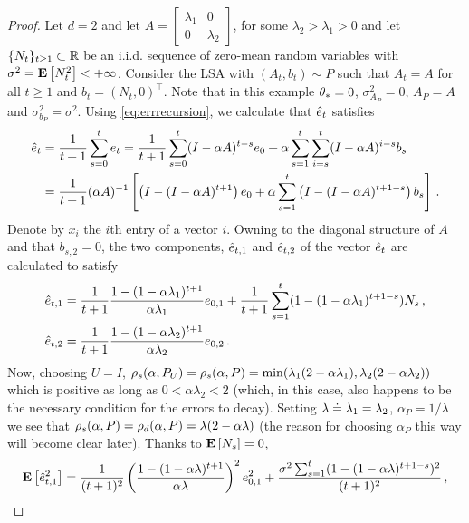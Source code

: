 \begin{proof}
Let $d=2$ and let
$A=\begin{bmatrix} \lambda_{1} &0\\ 0& \lambda_{2}\end{bmatrix}$, 
for some $\lambda_{2}>\lambda_{1}>0$ and let $\{N_t\}_{t\ge 1}\subset \mathbb{R}$ be an i.i.d. sequence of zero-mean random variables with $\sigma^2 = \mathbf{E}\left[ N_t^2 \right]<+\infty$.
Consider the LSA with $(A_t,b_t)\sim P$ such that 
$A_t=A$ for all $t\ge 1$ 
and $b_t = (N_t,0)^\top$.
Note that in this example $\theta_*=0$, $\sigma_{A_P}^2 = 0$, $A_P=A$ and $\sigma_{b_P}^2 = \sigma^2$.
Using \eqref{eq:errrecursion}, we calculate that $\hat{e}_t$ satisfies
\begin{align*}
\hat{e}_t&=\frac{1}{t+1}\sum_{s=0}^t e_t = \frac{1}{t+1}\sum_{s=0}^t (I-\alpha A)^{t-s} e_0 +\alpha \sum_{s=1}^t \sum_{i=s}^t (I-\alpha A)^{i-s} b_s\\
&=\frac{1}{t+1}(\alpha A)^{-1}\left[\left(I-(I-\alpha A)^{t+1}\right)e_0 + \alpha \sum_{s=1}^t \left(I-(I-\alpha A)^{t+1-s}\right) b_s\right]\,.
\end{align*}
Denote by $x_i$ the $i$th entry of a vector $i$.
Owning to the diagonal structure of $A$ and that $b_{s,2}=0$,
the two components, $\hat{e}_{t,1}$ and $\hat{e}_{t,2}$ of the vector $\hat{e}_t$ are calculated to satisfy
\begin{align*}
\hat{e}_{t,1} & =  \frac{1}{t+1} \frac{1-(1-\alpha \lambda_1)^{t+1}}{ \alpha \lambda_1} e_{0,1}
					+ \frac{1}{t+1} \sum_{s=1}^t (1-(1-\alpha \lambda_1)^{t+1-s}) N_s\,,\\
\hat{e}_{t,2} & =  \frac{1}{t+1} \frac{1-(1-\alpha \lambda_2)^{t+1}}{ \alpha \lambda_2} e_{0,2}\,.
\end{align*}
Now, choosing $U=I$, $\rho_s(\alpha,P_U) = \rho_s(\alpha,P) = \min( \lambda_1(2-\alpha \lambda_1), \lambda_2 (2-\alpha \lambda_2) )$ which is positive as long as $0<\alpha \lambda_2<2$ (which, in this case, also happens to be the necessary condition for the errors to decay).
Setting $\lambda \doteq \lambda_1=\lambda_2$,
$\alpha_P = 1/\lambda$ we see that 
$\rho_s(\alpha,P)=\rho_d(\alpha,P) = \lambda(2-\alpha \lambda)$ (the reason for choosing $\alpha_P$ this way will become clear later). 
Thanks to $\mathbf{E}\left[N_s\right]=0$,
\begin{align*}
\mathbf{E}\left[\hat{e}^2_{t,1}\right] =
 \frac{1}{(t+1)^2} \left(\frac{1-(1-\alpha \lambda)^{t+1}}{ \alpha \lambda}\right)^2 e_{0,1}^2
					+ \frac{ \sigma^2 \sum_{s=1}^t (1-(1-\alpha \lambda)^{t+1-s})^2 }{(t+1)^2}\,,
\end{align*}

\end{proof}
